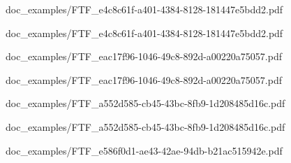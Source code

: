 \documentclass{report}
\begin{document}
        
                    {doc_examples/FTF_e4c8c61f-a401-4384-8128-181447e5bdd2.pdf}
        
                    {doc_examples/FTF_e4c8c61f-a401-4384-8128-181447e5bdd2.pdf}


        
                    {doc_examples/FTF_eac17f96-1046-49c8-892d-a00220a75057.pdf}
        
                    {doc_examples/FTF_eac17f96-1046-49c8-892d-a00220a75057.pdf}
            
        
                    {doc_examples/FTF_a552d585-cb45-43bc-8fb9-1d208485d16c.pdf}
        
                    {doc_examples/FTF_a552d585-cb45-43bc-8fb9-1d208485d16c.pdf}
                    

        
                    {doc_examples/FTF_e586f0d1-ae43-42ae-94db-b21ac515942e.pdf}            
\end{document}

